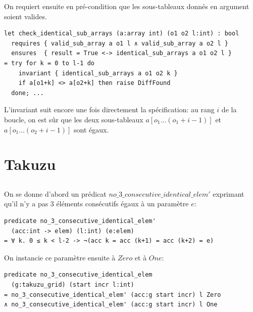 ﻿\documentclass[10pt,a4paper]{article}
\begin{document}
On requiert ensuite en pré-condition que les sous-tableaux donnés en argument soient valides.
\begin{verbatim}
let check_identical_sub_arrays (a:array int) (o1 o2 l:int) : bool
  requires { valid_sub_array a o1 l ∧ valid_sub_array a o2 l }
  ensures  { result = True <-> identical_sub_arrays a o1 o2 l }
= try for k = 0 to l-1 do
    invariant { identical_sub_arrays a o1 o2 k }
    if a[o1+k] <> a[o2+k] then raise DiffFound
  done; ...
\end{verbatim}
L'invariant suit encore une fois directement la spécification: au rang $i$ de la boucle, on est sûr que les deux sous-tableaux $a[o_1...(o_1+i-1)]$ et $a[o_1...(o_2+i-1)]$ sont égaux.

\section{Takuzu}
\subsection{}
On se donne d'abord un prédicat $no\_3\_consecutive\_identical\_elem'$ exprimant qu'il n'y a pas 3 éléments consécutifs égaux à un paramètre $e$:
\begin{verbatim}
predicate no_3_consecutive_identical_elem'
  (acc:int -> elem) (l:int) (e:elem)
= ∀ k. 0 ≤ k < l-2 -> ¬(acc k = acc (k+1) = acc (k+2) = e)
\end{verbatim}

On instancie ce paramètre ensuite à $Zero$ et à $One$:
\begin{verbatim}
predicate no_3_consecutive_identical_elem
  (g:takuzu_grid) (start incr l:int)
= no_3_consecutive_identical_elem' (acc:g start incr) l Zero
∧ no_3_consecutive_identical_elem' (acc:g start incr) l One
\end{verbatim}
\end{document}

